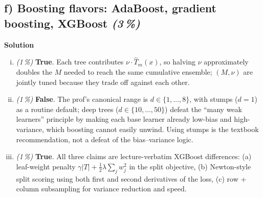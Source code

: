 \documentclass[11pt,a4paper]{article}
\newcommand{\subpoints}[1]{\textit{(#1\,\%)}}
\newcommand{\sol}{\noindent\textbf{Solution}}
\begin{document}
\subsection*{f) Boosting flavors: AdaBoost, gradient boosting, XGBoost \subpoints{3}}
\sol{}
\begin{enumerate}[(i)]
  \item \subpoints{1} \textbf{True}. Each tree contributes $\nu\cdot\hat T_m(x)$, so halving $\nu$
        approximately doubles the $M$ needed to reach the same cumulative ensemble; $(M,\nu)$
        are jointly tuned because they trade off against each other.
  \item \subpoints{1} \textbf{False}. The prof's canonical range is $d \in \{1,\dots,8\}$,
        with stumps ($d=1$) as a routine default; deep trees ($d \in \{10,\dots,50\}$) defeat
        the ``many weak learners'' principle by making each base learner already low-bias and
        high-variance, which boosting cannot easily unwind. Using stumps is the textbook
        recommendation, not a defeat of the bias--variance logic.
  \item \subpoints{1} \textbf{True}. All three claims are lecture-verbatim XGBoost differences:
        (a) leaf-weight penalty $\gamma|T| + \tfrac{1}{2}\lambda\sum_j w_j^2$ in the split
        objective, (b) Newton-style split scoring using both first and second derivatives of
        the loss, (c) row + column subsampling for variance reduction and speed.
\end{enumerate}
\end{document}
